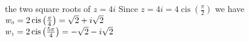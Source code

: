 { the two square roots of $z = 4i$ \label{polarrootsfirst}}
{ Since $z=4i = 4\operatorname{cis}\left(\frac{\pi}{2}\right)$ we have \\$w_{\text{\tiny$0$}} = 2\operatorname{cis}\left(\frac{\pi}{4}\right) = \sqrt{2} +i\sqrt{2}$\\$w_{\text{\tiny$1$}} = 2\operatorname{cis}\left(\frac{5\pi}{4}\right) = -\sqrt{2} - i\sqrt{2}$}
